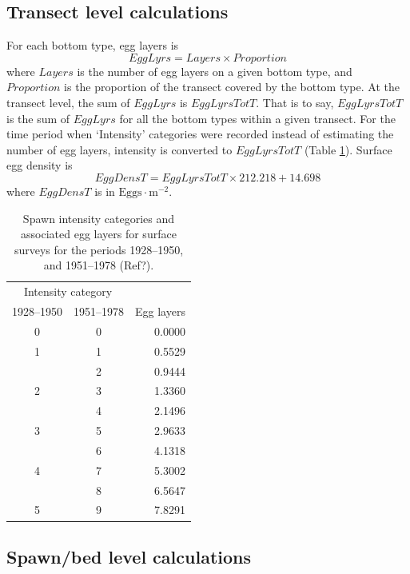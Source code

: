 \documentclass[12pt]{article}
\begin{document}
\subsection{Transect level calculations}

For each bottom type, egg layers is
\begin{equation}
EggLyrs = Layers \times Proportion
\label{eqEggLayersSurf}
\end{equation}
where $Layers$ is the number of egg layers on a given bottom type, and $Proportion$ is the proportion of the transect covered by the bottom type.
At the transect level, the sum of $EggLyrs$ is $EggLyrsTotT$.
That is to say, $EggLyrsTotT$ is the sum of $EggLyrs$ for all the bottom types within a given transect.
For the time period when `Intensity' categories were recorded instead of estimating the number of egg layers, intensity is converted to $EggLyrsTotT$ (Table \ref{tabIntensity}).
Surface egg density is \citep{SchweigertEtal1997}
\begin{equation}
EggDensT = EggLyrsTotT \times 212.218 + 14.698
\label{eqEggDensSurf}
\end{equation}
where $EggDensT$ is in $\text{Eggs} \cdot \text{m}^{-2}$. 

\begin{table}
\centering
\caption{Spawn intensity categories and associated egg layers for surface surveys for the periods 1928--1950, and 1951--1978 (Ref?).}
\begin{tabular}{ccr}
\toprule
\multicolumn{2}{c}{Intensity category} & \\
1928--1950 & 1951--1978 & Egg layers\\
\midrule
0 & 0 & 0.0000 \\
1 & 1 & 0.5529 \\
 & 2 & 0.9444 \\
2 & 3 & 1.3360 \\
 & 4 & 2.1496 \\
3 & 5 & 2.9633 \\
 & 6 & 4.1318 \\
4 & 7 & 5.3002 \\
 & 8 & 6.5647 \\
5 & 9 & 7.8291 \\
\bottomrule
\end{tabular}
\label{tabIntensity}
\end{table}

\subsection{Spawn/bed level calculations}
\end{document}
